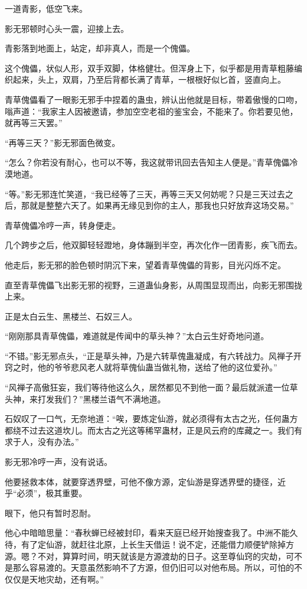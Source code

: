 \begin{this_body}
一道青影，低空飞来。

影无邪顿时心头一震，迎接上去。

青影落到地面上，站定，却非真人，而是一个傀儡。

这个傀儡，状似人形，双手双脚，体格健壮。但浑身上下，似乎都是用青草粗藤编织起来，头上，双肩，乃至后背都长满了青草，一根根好似匕首，竖直向上。

青草傀儡看了一眼影无邪手中捏着的蛊虫，辨认出他就是目标，带着傲慢的口吻，嗡声道：“我家主人因被邀请，参加空空老祖的鉴宝会，不能来了。你若要见他，就再等三天罢。”

“再等三天？”影无邪面色微变。

“怎么？你若没有耐心，也可以不等，我这就带讯回去告知主人便是。”青草傀儡冷漠地道。

“等。”影无邪连忙笑道，“我已经等了三天，再等三天又何妨呢？只是三天过去之后，那就是整整六天了。如果再无缘见到你的主人，那我也只好放弃这场交易。”

青草傀儡冷哼一声，转身便走。

几个跨步之后，他双脚轻轻蹬地，身体蹦到半空，再次化作一团青影，疾飞而去。

他走后，影无邪的脸色顿时阴沉下来，望着青草傀儡的背影，目光闪烁不定。

直至青草傀儡飞出影无邪的视野，三道蛊仙身影，从周围显现而出，向影无邪围拢上来。

正是太白云生、黑楼兰、石奴三人。

“刚刚那具青草傀儡，难道就是传闻中的草头神？”太白云生好奇地问道。

“不错。”影无邪点头，“正是草头神，乃是六转草傀蛊凝成，有六转战力。风禅子开窍之时，他的爷爷悲风老人就将草傀仙蛊当做礼物，送给了他的这位爱孙。”

“风禅子高傲狂妄，我们等待他这么久，居然都见不到他一面？最后就派遣一位草头神，来打发我们？”黑楼兰语气不满地道。

石奴叹了一口气，无奈地道：“唉，要炼定仙游，就必须得有太古之光，任何蛊方都绕不过去这道坎儿。而太古之光这等稀罕蛊材，正是风云府的库藏之一。我们有求于人，没有办法。”

影无邪冷哼一声，没有说话。

他要拯救本体，就要穿透界壁，可他不像方源，定仙游是穿透界壁的捷径，近乎“必须”，极其重要。

眼下，他只有暂时忍耐。

他心中暗暗思量：“春秋蝉已经被封印，看来天庭已经开始搜查我了。中洲不能久待，有了定仙游，就赶往北原，上长生天借运！说不定，还能借力顺便铲除掉方源。嗯？不对，算算时间，明天就该是方源渡劫的日子。这至尊仙窍的灾劫，可不是那么容易渡的。天意虽然影响不了方源，但仍旧可以对他布局。所以，可怕的不仅仅是天地灾劫，还有啊。”

\end{this_body}

